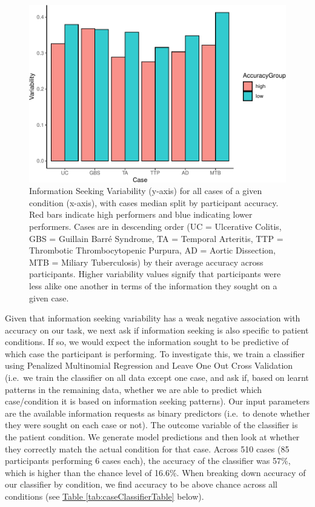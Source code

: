 \documentclass[a4paper, nobind]{templates/ociamthesis}
\begin{document}
\begin{figure}[H]

{\centering \includegraphics[width=1\linewidth]{_main_files/figure-latex/accVarSplitPlot-1} 

}

\caption{Information Seeking Variability (y-axis) for all cases of a given condition (x-axis), with cases median split by participant accuracy. Red bars indicate high performers and blue indicating lower performers. Cases are in descending order (UC = Ulcerative Colitis, GBS = Guillain Barré Syndrome, TA = Temporal Arteritis, TTP = Thrombotic Thrombocytopenic Purpura, AD = Aortic Dissection, MTB = Miliary Tuberculosis) by their average accuracy across participants. Higher variability values signify that participants were less alike one another in terms of the information they sought on a given case.}\label{fig:accVarSplitPlot}
\end{figure}

\hfill\break

Given that information seeking variability has a weak negative association with accuracy on our task, we next ask if information seeking is also specific to patient conditions. If so, we would expect the information sought to be predictive of which case the participant is performing. To investigate this, we train a classifier using Penalized Multinomial Regression and Leave One Out Cross Validation (i.e.~we train the classifier on all data except one case, and ask if, based on learnt patterns in the remaining data, whether we are able to predict which case/condition it is based on information seeking patterns). Our input parameters are the available information requests as binary predictors (i.e.~to denote whether they were sought on each case or not). The outcome variable of the classifier is the patient condition. We generate model predictions and then look at whether they correctly match the actual condition for that case. Across 510 cases (85 participants performing 6 cases each), the accuracy of the classifier was 57\%, which is higher than the chance level of 16.6\%. When breaking down accuracy of our classifier by condition, we find accuracy to be above chance across all conditions (see \hyperref[tab:caseClassifierTable]{Table \ref{tab:caseClassifierTable}} below).
\end{document}
